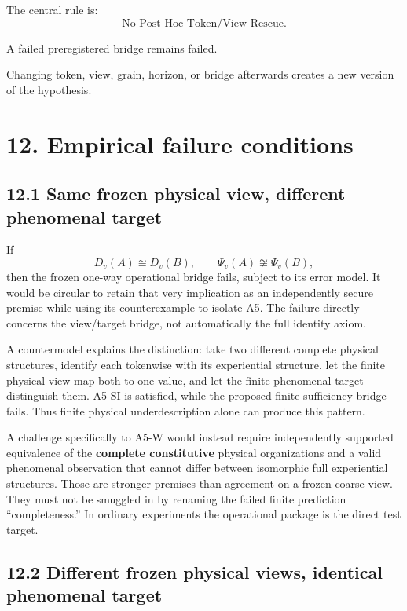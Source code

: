 \documentclass[
  11pt,
  a4paper,
]{article}
\begin{document}
The central rule is:
\nopagebreak[4]
\[
\boxed{
\text{No Post-Hoc Token/View Rescue}.
}
\]

A failed preregistered bridge remains failed.

Changing token, view, grain, horizon, or bridge afterwards creates a new
version of the hypothesis.

\hypertarget{empirical-failure-conditions}{%
\section{12. Empirical failure
conditions}\label{empirical-failure-conditions}}

\hypertarget{same-frozen-physical-view-different-phenomenal-target}{%
\subsection{12.1 Same frozen physical view, different phenomenal
target}\label{same-frozen-physical-view-different-phenomenal-target}}

If \[
D_v(A)\cong D_v(B),\qquad \Psi_v(A)\not\cong\Psi_v(B),
\] then the frozen one-way operational bridge fails, subject to its
error model. It would be circular to retain that very implication as an
independently secure premise while using its counterexample to isolate
A5. The failure directly concerns the view/target bridge, not
automatically the full identity axiom.

A countermodel explains the distinction: take two different complete
physical structures, identify each tokenwise with its experiential
structure, let the finite physical view map both to one value, and let
the finite phenomenal target distinguish them. A5-SI is satisfied, while
the proposed finite sufficiency bridge fails. Thus finite physical
underdescription alone can produce this pattern.

A challenge specifically to A5-W would instead require independently
supported equivalence of the \textbf{complete constitutive} physical
organizations and a valid phenomenal observation that cannot differ
between isomorphic full experiential structures. Those are stronger
premises than agreement on a frozen coarse view. They must not be
smuggled in by renaming the failed finite prediction ``completeness.''
In ordinary experiments the operational package is the direct test
target.

\hypertarget{different-frozen-physical-views-identical-phenomenal-target}{%
\subsection{12.2 Different frozen physical views, identical phenomenal
target}\label{different-frozen-physical-views-identical-phenomenal-target}}
\end{document}

